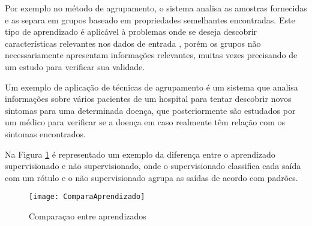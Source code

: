  Por exemplo no método de agrupamento, o sistema analisa as amostras fornecidas e as separa em grupos baseado em propriedades semelhantes encontradas. Este tipo de aprendizado é aplicável à problemas onde se deseja descobrir características relevantes nos dados de entrada \cite{goldschmidt}, porém os grupos não necessariamente apresentam informações relevantes, muitas vezes precisando de um estudo para verificar sua validade.\cite{Monard2003a} 

 Um exemplo de aplicação de técnicas de agrupamento é um sistema que analisa informações sobre vários pacientes de um hospital para tentar descobrir novos sintomas para uma determinada doença, que posteriormente são estudados por um médico para verificar se a doença em caso realmente têm relação com os sintomas encontrados.

 Na Figura \ref{fig:comparacaoaprendizado} é representado um exemplo da diferença entre o aprendizado supervisionado e não supervisionado, onde o supervisionado classifica cada saída com um rótulo e o não supervisionado agrupa as saídas de acordo com padrões. 


 \begin{figure}[htb]
 \caption{\label{fig:comparacaoaprendizado} Comparaçao entre aprendizados}
 \begin{center}
 \texttt{[image: ComparaAprendizado]}
 \end{center}
 \end{figure}

